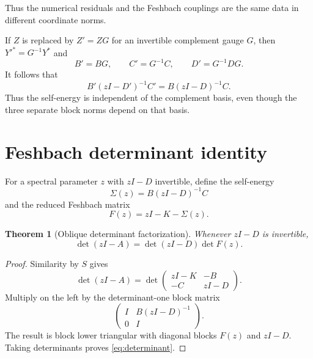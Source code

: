 \documentclass[12pt]{article}
\newtheorem{theorem}{Theorem}[section]
\theoremstyle{remark}
\begin{document}
Thus the numerical residuals and the Feshbach couplings are the same data in
different coordinate norms.

If $Z$ is replaced by $Z'=ZG$ for an invertible complement gauge $G$, then
$Y'^*=G^{-1}Y^*$ and
\begin{equation}\label{eq:complement-gauge}
 B'=BG,
 \qquad C'=G^{-1}C,
 \qquad D'=G^{-1}DG.
\end{equation}
It follows that
\begin{equation}\label{eq:complement-self-energy-invariance}
 B'(zI-D')^{-1}C'=B(zI-D)^{-1}C.
\end{equation}
Thus the self-energy is independent of the complement basis, even though
the three separate block norms depend on that basis.

\section{Feshbach determinant identity}

For a spectral parameter $z$ with $zI-D$ invertible, define the self-energy
\begin{equation}\label{eq:self-energy}
 \Sigma(z)=B(zI-D)^{-1}C
\end{equation}
and the reduced Feshbach matrix
\begin{equation}\label{eq:feshbach-matrix}
 F(z)=zI-K-\Sigma(z).
\end{equation}

\begin{theorem}[Oblique determinant factorization]\label{thm:determinant}
Whenever $zI-D$ is invertible,
\begin{equation}\label{eq:determinant}
 \boxed{
 \det(zI-A)=\det(zI-D)\det F(z).
 }
\end{equation}
\end{theorem}

\begin{proof}
Similarity by $S$ gives
\[
 \det(zI-A)
 =\det\begin{pmatrix}zI-K&-B\\-C&zI-D\end{pmatrix}.
\]
Multiply on the left by the determinant-one block matrix
\[
 \begin{pmatrix}I&B(zI-D)^{-1}\\0&I\end{pmatrix}.
\]
The result is block lower triangular with diagonal blocks
$F(z)$ and $zI-D$.  Taking determinants proves
\eqref{eq:determinant}.
\end{proof}
\end{document}
